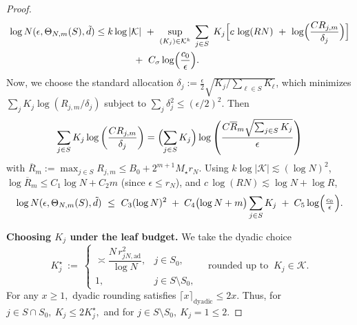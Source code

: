 \documentclass[11pt]{article}
\theoremstyle{plain}
\theoremstyle{definition}
\theoremstyle{plain}
\begin{document}
\begin{proof}
\begin{align}
\log N(\epsilon,\Theta_{N,m}(S),\tilde d)
&\le k\log|\mathcal K|\ +\ \sup_{(K_j)\in\mathcal K^k}\;\sum_{j\in S}\;K_j\Bigl[c\,\log(RN)\ +\ \log\Bigl(\frac{C R_{j,m}}{\delta_j}\Bigr)\Bigr]\nonumber\\
&\qquad\qquad +\ C_\sigma\log\Bigl(\frac{c_0}{\epsilon}\Bigr).\label{eq:prod}
\end{align}
Now, we choose the standard allocation $\delta_j:=\frac{\epsilon}{2}\sqrt{K_j/\sum_{\ell\in S}K_\ell}$, which minimizes $\sum_j K_j\log(R_{j,m}/\delta_j)$ subject to $\sum_j\delta_j^2\le (\epsilon/2)^2$. Then
\[
\sum_{j\in S} K_j\log \left(\frac{C R_{j,m}}{\delta_j}\right)
= \Bigl(\sum_{j\in S}K_j\Bigr)\log\left(\frac{C \overline R_m \sqrt{\sum_{j\in S}K_j}}{\epsilon}\right)
\]
with $\overline R_m:=\max_{j\in S}R_{j,m}\le B_0+2^{m+1}M_\star r_N$. Using $k\log|\mathcal K|\lesssim (\log N)^2$, $\log\overline R_m\le C_1\log N + C_2 m$ (since $\epsilon\le r_N$), and $c\,\log(RN)\lesssim\log N+\log R$,
\begin{equation}\label{eq:prod2}
\log N(\epsilon,\Theta_{N,m}(S),\tilde d)
\ \le\ C_3(\log N)^2\;+\; C_4\bigl(\log N + m\bigr)\sum_{j\in S}K_j\;+\; C_5\log\Bigl(\tfrac{c_0}{\epsilon}\Bigr).
\end{equation}

\textbf{Choosing $K_j$ under the leaf budget.}
We take the dyadic choice
\[
K_j^\star\ :=\
\begin{cases}
\asymp \dfrac{N\,r_{jN,\mathrm{ad}}^2}{\log N}, & j\in S_0,\\[8pt]
1, & j\in S\setminus S_0,
\end{cases}
\quad\text{rounded up to }\ K_j\in\mathcal K.
\]
For any $x \ge 1,$ dyadic rounding satisfies $\lceil x\rceil_{\text{dyadic}} \le 2x.$ Thus, for $j \in S \cap S_0, \ K_j \le 2K_j ^{\star},$ and for $j \in S \setminus S_0, \ K_j=1 \le 2.$ 


\end{proof}
\end{document}
